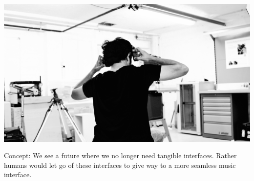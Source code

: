 \documentclass[sigchi]{acmart}
\begin{document}


\begin{teaserfigure}
  \includegraphics[trim={0 5.5cm 0 3.5cm}, clip, width=\textwidth]{acmart-master-2/samples/test2bw.png}
  \caption{Concept: We see a future where we no longer need tangible interfaces. Rather humans would let go of these interfaces to give way to a more seamless music interface.}
  \label{fig:teaser}
\end{teaserfigure}
\maketitle
\end{document}
